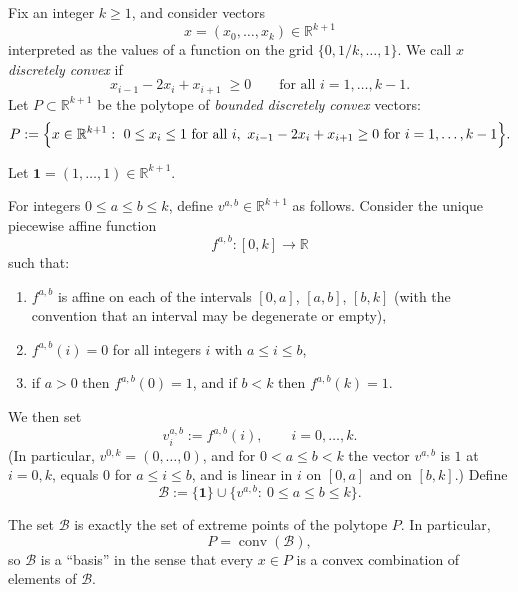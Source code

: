 \newcommand{\RR}{\mathbb{R}}

\begin{definition}
    Fix an integer $k\ge1$, and consider vectors
    \[
        x=(x_0,\dots,x_k)\in\RR^{k+1}
    \]
    interpreted as the values of a function on the grid $\{0,1/k,\dots,1\}$.
    We call $x$ \emph{discretely convex} if
    \[
        x_{i-1}-2x_i+x_{i+1}\;\ge 0\qquad\text{for all }i=1,\dots,k-1.
    \]
    Let $P\subset\RR^{k+1}$ be the polytope of \emph{bounded discretely convex} vectors:
    \[
        P:=\Bigl\{x\in\RR^{k+1}:\ 0\le x_i\le1\ \text{for all }i,\
        x_{i-1}-2x_i+x_{i+1}\ge0\ \text{for }i=1,\dots,k-1\Bigr\}.
    \]
\end{definition}

\begin{definition}
    Let $\mathbf{1}=(1,\dots,1)\in\RR^{k+1}$.

    For integers $0\le a\le b\le k$, define $v^{a,b}\in\RR^{k+1}$ as follows.
    Consider the unique piecewise affine function
    \[
        f^{a,b}:[0,k]\to\RR
    \]
    such that:
    \begin{enumerate}
        \item $f^{a,b}$ is affine on each of the intervals $[0,a]$, $[a,b]$, $[b,k]$ (with the convention that an interval may be degenerate or empty),
        \item $f^{a,b}(i)=0$ for all integers $i$ with $a\le i\le b$,
        \item if $a>0$ then $f^{a,b}(0)=1$, and if $b<k$ then $f^{a,b}(k)=1$.
    \end{enumerate}
    We then set
    \[
        v^{a,b}_i := f^{a,b}(i),\qquad i=0,\dots,k.
    \]
    (In particular, $v^{0,k}=(0,\dots,0)$, and for $0<a\le b<k$ the vector
    $v^{a,b}$ is $1$ at $i=0,k$, equals $0$ for $a\le i\le b$, and is linear in $i$
    on $[0,a]$ and on $[b,k]$.)
    Define
    \[
        \mathcal{B}:=\{\mathbf{1}\}\cup\{v^{a,b}:\ 0\le a\le b\le k\}.
    \]
\end{definition}

\begin{theorem}
    The set $\mathcal{B}$ is exactly the set of extreme points of the polytope $P$.
    In particular,
    \[
        P = \operatorname{conv}(\mathcal{B}),
    \]
    so $\mathcal{B}$ is a ``basis'' in the sense that every $x\in P$ is a convex combination of elements of $\mathcal{B}$.
\end{theorem}

